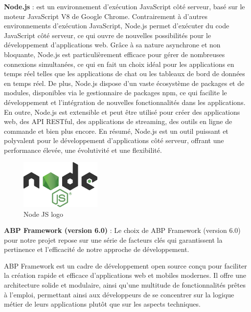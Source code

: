 \textbf{Node.js} : est un environnement d'exécution JavaScript côté serveur, basé sur le moteur JavaScript V8 de Google Chrome. Contrairement à d'autres environnements d'exécution JavaScript, Node.js permet d'exécuter du code JavaScript côté serveur, ce qui ouvre de nouvelles possibilités pour le développement d'applications web. Grâce à sa nature asynchrone et non bloquante, Node.js est particulièrement efficace pour gérer de nombreuses connexions simultanées, ce qui en fait un choix idéal pour les applications en temps réel telles que les applications de chat ou les tableaux de bord de données en temps réel. De plus, Node.js dispose d'un vaste écosystème de packages et de modules, disponibles via le gestionnaire de packages npm, ce qui facilite le développement et l'intégration de nouvelles fonctionnalités dans les applications. En outre, Node.js est extensible et peut être utilisé pour créer des applications web, des API RESTful, des applications de streaming, des outils en ligne de commande et bien plus encore. En résumé, Node.js est un outil puissant et polyvalent pour le développement d'applications côté serveur, offrant une performance élevée, une évolutivité et une flexibilité.
\\
\begin{figure}[H]
    \centering
    \includegraphics[width=4cm]{Figures/nodejs.png}
    \caption{Node JS logo}
\end{figure}






\textbf{ABP Framework (version 6.0)} \cite{ref7} : Le choix de ABP Framework (version 6.0) pour notre projet repose sur une série de facteurs clés qui garantissent la pertinence et l'efficacité de notre approche de développement.

ABP Framework est un cadre de développement open source conçu pour faciliter la création rapide et efficace d'applications web et mobiles modernes. Il offre une architecture solide et modulaire, ainsi qu'une multitude de fonctionnalités prêtes à l'emploi, permettant ainsi aux développeurs de se concentrer sur la logique métier de leurs applications plutôt que sur les aspects techniques.

